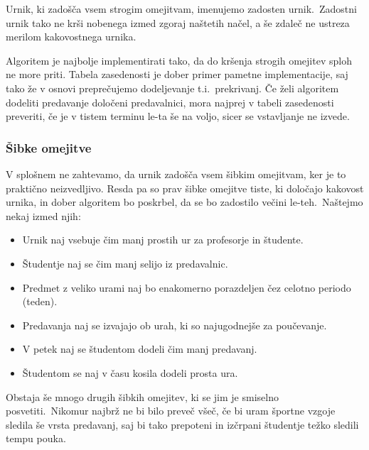 \documentclass[a4paper,10pt]{article}
\begin{document}
Urnik, ki zadošča vsem strogim omejitvam, imenujemo zadosten urnik.\ Zadostni urnik tako ne
krši nobenega izmed zgoraj naštetih načel, a še zdaleč ne ustreza merilom kakovostnega urnika.

Algoritem je najbolje implementirati tako, da do kršenja strogih omejitev sploh ne more priti.
Tabela zasedenosti je dober primer pametne implementacije, saj tako že v osnovi  preprečujemo
dodeljevanje t.i.\ prekrivanj. Če želi algoritem dodeliti predavanje določeni predavalnici,
mora najprej v tabeli zasedenosti preveriti, če je v tistem terminu le-ta še na voljo,
sicer se vstavljanje ne izvede.

\subsubsection{Šibke omejitve}

V splošnem ne zahtevamo, da urnik zadošča vsem šibkim omejitvam, ker je to praktično neizvedljivo.
Resda pa so prav šibke omejitve tiste, ki določajo kakovost urnika, in dober algoritem bo
poskrbel, da se bo zadostilo večini le-teh.\ Naštejmo nekaj izmed njih:

   \begin{itemize}
   \item Urnik naj vsebuje čim manj prostih ur za profesorje in študente.
   \item Študentje naj se čim manj selijo iz predavalnic.
   \item Predmet z veliko urami naj bo enakomerno porazdeljen čez celotno periodo (teden).
   \item Predavanja naj se izvajajo ob urah, ki so najugodnejše za poučevanje.
   \item V petek naj se študentom dodeli čim manj predavanj.
   \item Študentom se naj v času kosila dodeli prosta ura.
\end{itemize}

Obstaja še mnogo drugih šibkih omejitev, ki se jim je smiselno posvetiti.\ Nikomur najbrž ne
bi bilo preveč všeč, če bi uram športne vzgoje sledila še vrsta predavanj, saj bi tako
prepoteni in izčrpani študentje težko sledili tempu pouka.
\end{document}
